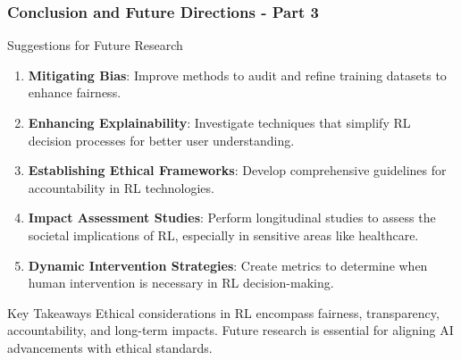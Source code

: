 \documentclass[aspectratio=169]{beamer}
\begin{document}
\begin{frame}[fragile]
    \frametitle{Conclusion and Future Directions - Part 3}
    \begin{block}{Suggestions for Future Research}
        \begin{enumerate}
            \item \textbf{Mitigating Bias}: Improve methods to audit and refine training datasets to enhance fairness.
            \item \textbf{Enhancing Explainability}: Investigate techniques that simplify RL decision processes for better user understanding.
            \item \textbf{Establishing Ethical Frameworks}: Develop comprehensive guidelines for accountability in RL technologies.
            \item \textbf{Impact Assessment Studies}: Perform longitudinal studies to assess the societal implications of RL, especially in sensitive areas like healthcare.
            \item \textbf{Dynamic Intervention Strategies}: Create metrics to determine when human intervention is necessary in RL decision-making.
        \end{enumerate}
    \end{block}
    
    \begin{block}{Key Takeaways}
        Ethical considerations in RL encompass fairness, transparency, accountability, and long-term impacts. Future research is essential for aligning AI advancements with ethical standards.
    \end{block}
\end{frame}
\end{document}
